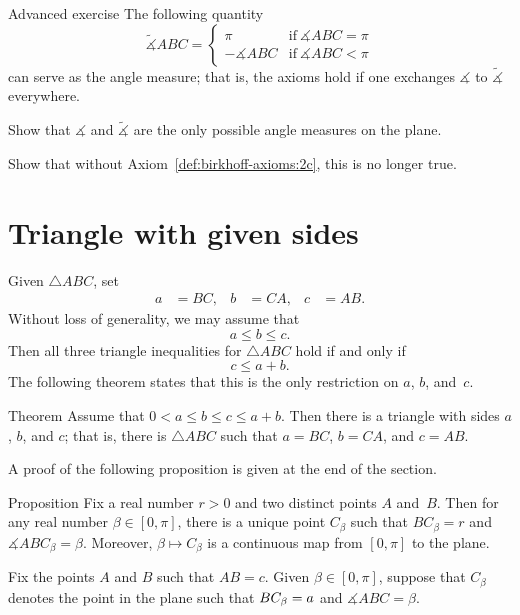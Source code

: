 \begin{thm}{Advanced exercise}\label{ex:angle-measures}
The following quantity 
$$\tilde\measuredangle ABC=
\begin{cases}
\pi&\text{if}\ \measuredangle ABC=\pi
\\
-\measuredangle ABC&\text{if}\ \measuredangle ABC<\pi
\end{cases}
$$
can serve as the angle measure; 
that is, the axioms hold if one exchanges $\measuredangle$ to $\tilde\measuredangle$ everywhere.

Show that $\measuredangle$ and $\tilde\measuredangle$ are the only possible angle measures on the plane. 

Show that without Axiom~\ref{def:birkhoff-axioms:2c}, this is no longer true.
\end{thm}

\section{Triangle with given sides}

Given $\triangle ABC$, set 
\begin{align*}
a&=BC,
&
b&=CA,
&
c&=AB.
\end{align*}
Without loss of generality, we may assume that 
\[a\le b \le c.\]
Then all three triangle inequalities for $\triangle ABC$
hold if and only if 
\[c\le a+b.\]
The following theorem states that this is the only restriction on $a$, $b$, and~$c$.

\begin{thm}[\abs]{Theorem}\label{thm:abc}
Assume that $0<a\le b\le c\le a+b$.
Then there is a triangle with sides $a$, $b$, and $c$;
that is, there is $\triangle ABC$ 
such that $a=BC$, $b=CA$, and $c=AB$.
\end{thm}

A proof of the following proposition is given at the end of the section.

\begin{thm}[\abs]{Proposition}\label{prop:C-cont}
Fix a real number $r>0$ 
and two distinct points $A$ and~$B$.
Then for 
any real number $\beta\in [0,\pi]$,
there is a unique point $C_\beta$ such that $BC_\beta=r$
and $\measuredangle ABC_\beta=\beta$.
Moreover, $\beta\mapsto C_\beta$ 
is a continuous map from $[0,\pi]$ to the plane.
\end{thm}

\label{page:proof:thm:abc}
Fix the points $A$ and $B$ such that $AB=c$.
Given $\beta\in [0,\pi]$,
suppose that $C_\beta$ denotes the point in the plane such that $BC_\beta=a$ and $\measuredangle ABC=\beta$.


